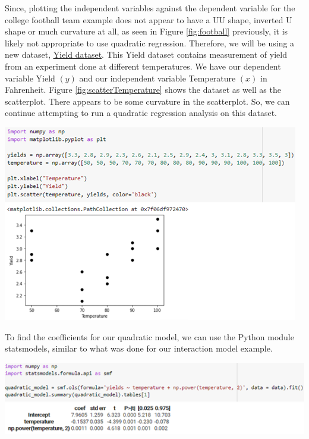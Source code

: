 \documentclass[a4paper,12pt]{report}
\newcommand{\link}[2]{\hyperlink{#1}{\underline{#2}}}
\begin{document}
Since, plotting the independent variables against the dependent variable for the college football team example does not appear to have a UU shape, inverted U shape or much curvature at all, as seen in Figure \ref{fig:football} previously, it is likely not appropriate to use quadratic regression. Therefore, we will be using a new dataset, \link{https://online.stat.psu.edu/stat462/node/159/}{Yield dataset}. This Yield dataset contains measurement of yield from an experiment done at different temperatures. We have our dependent variable Yield $(y)$ and our independent variable Temperature $(x)$ in Fahrenheit. Figure \ref{fig:scatterTemperature} shows the dataset as well as the scatterplot. There appears to be some curvature in the scatterplot. So, we can continue attempting to run a quadratic regression analysis on this dataset.

\begin{center}
    \captionsetup{type=figure}
    \includegraphics[width=.9\linewidth]{media/scatterTemperature.png}
    \label{fig:scatterTemperature}
\end{center}

To find the coefficients for our quadratic model, we can use the Python module statsmodels, similar to what was done for our interaction model example. 

\begin{center}
    \captionsetup{type=figure}
    \includegraphics[width=.9\linewidth]{media/smfols.png}
    \label{fig:smfols}
\end{center}
\end{document}
